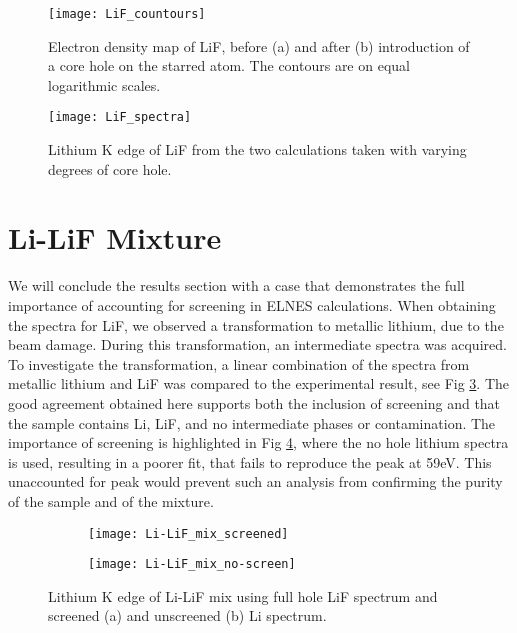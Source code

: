 \begin{figure}
	\centering
	\texttt{[image: LiF\_countours]}
	\caption{Electron density map of LiF, before (a) and after (b) introduction of a core hole on the starred atom.  The contours are on equal logarithmic scales.}
	\label{LiF_countours}
\end{figure}

\begin{figure}
	\centering
	\texttt{[image: LiF\_spectra]}
	\caption{Lithium K edge of LiF from the two calculations taken with varying degrees of core hole. }
	\label{LiF_spectra}
\end{figure}



\section{Li-LiF Mixture}
We will conclude the results section with a case that demonstrates the full importance of accounting for screening in ELNES calculations.  When obtaining the spectra for LiF, we observed a transformation to metallic lithium, due to the beam damage.   During this transformation, an intermediate spectra was acquired.  To investigate the transformation, a linear combination of the spectra from metallic lithium and LiF was compared to the experimental result, see Fig \ref{mix-screened}.  The good agreement obtained here supports both the inclusion of screening and that the sample contains  Li, LiF, and no intermediate phases or contamination.  The importance of screening is highlighted in Fig \ref{mix-unscreened}, where the no hole lithium spectra is used, resulting in a poorer fit, that fails to reproduce the peak at 59eV.  This unaccounted for peak would prevent such an  analysis from confirming the purity of the sample and of the mixture.  



\begin{figure}
	\centering
	\begin{subfigure}{0.45\textwidth}
		\texttt{[image: Li-LiF\_mix\_screened]}
		\caption{}
		\label{mix-screened}
	\end{subfigure}
\hfill
	\begin{subfigure}{0.45\textwidth}
		\texttt{[image: Li-LiF\_mix\_no-screen]}
		\caption{}
		\label{mix-unscreened}
	\end{subfigure}
	\caption{Lithium K edge of Li-LiF mix using full hole LiF spectrum and screened (a) and unscreened (b) Li spectrum. }

\label{Li-LiF_mix_screened}
\end{figure}

\newpage




